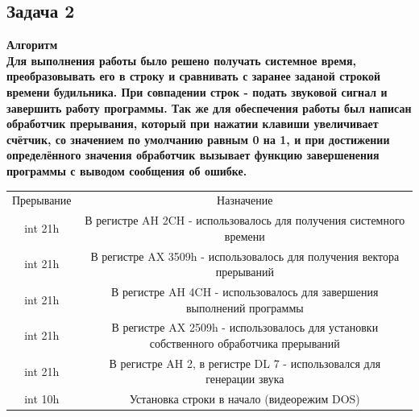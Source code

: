 \documentclass{article}
\begin{document}
\subsection{Задача 2}
\flushbottom
\bfseries Алгоритм \\ \mdseries
Для выполнения работы было решено получать системное время, преобразовывать его в строку и сравнивать с заранее заданой строкой времени будильника. При совпадении строк - подать звуковой сигнал и завершить работу программы. Так же для обеспечения работы был написан обработчик прерывания, который при нажатии клавиши увеличивает счётчик, со значением по умолчанию равным 0 на 1, и при достижении определённого значения обработчик вызывает функцию завершенения программы с выводом сообщения об ошибке. \\
\begin{tabular}{cc}
	Прерывание &                                       Назначение                                       \\
	 int 21h   &          В регистре AH 2CH - использовалось для получения системного времени           \\
	 int 21h   &         В регистре AX 3509h - использовалось для получения вектора прерываний          \\
	 int 21h   &         В регистре AH 4CH - использовалось для завершения выполнений программы         \\
	 int 21h   & В регистре AX 2509h - использовалось для установки собственного обработчика прерываний \\
	 int 21h   &          В регистре AH 2, в регистре DL 7 - использовался для генерации звука          \\
	 int 10h   &                       Установка строки в начало (видеорежим DOS)
\end{tabular} \\
\end{document}
